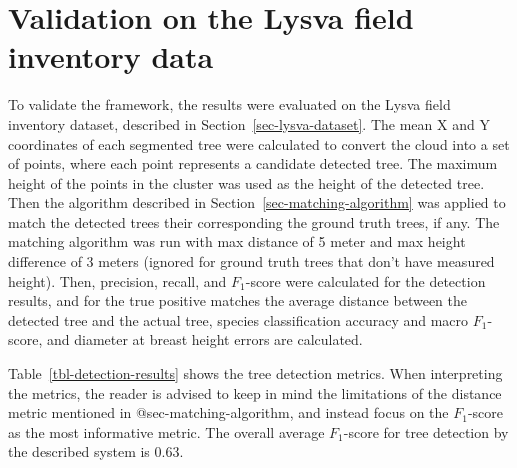 \section{Validation on the Lysva field inventory data}

To validate the framework, the results were evaluated on the Lysva field inventory dataset, described in Section~\ref{sec-lysva-dataset}.
The mean X and Y coordinates of each segmented tree were calculated to convert the cloud into a set of points, where each point represents a candidate detected tree.
The maximum height of the points in the cluster was used as the height of the detected tree.
Then the algorithm described in Section~\ref{sec-matching-algorithm} was applied to match the detected trees their corresponding the ground truth trees, if any.
The matching algorithm was run with max distance of 5 meter and max height difference of 3 meters (ignored for ground truth trees that don't have measured height).
Then, precision, recall, and $F_1$-score were calculated for the detection results, and for the true positive matches the average distance between the detected tree and the actual tree, species classification accuracy and macro $F_1$-score, and diameter at breast height errors are calculated.

Table~\ref{tbl-detection-results} shows the tree detection metrics.
When interpreting the metrics, the reader is advised to keep in mind the limitations of the distance metric mentioned in @sec-matching-algorithm, and instead focus on the $F_1$-score as the most informative metric.
The overall average $F_1$-score for tree detection by the described system is 0.63.

